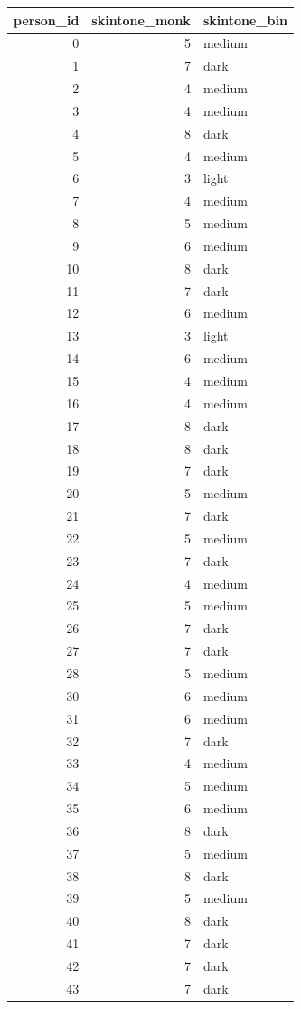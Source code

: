 \begin{tabular}{rrl}
\toprule
person\_id & skintone\_monk & skintone\_bin \\
\midrule
0 & 5 & medium \\
1 & 7 & dark \\
2 & 4 & medium \\
3 & 4 & medium \\
4 & 8 & dark \\
5 & 4 & medium \\
6 & 3 & light \\
7 & 4 & medium \\
8 & 5 & medium \\
9 & 6 & medium \\
10 & 8 & dark \\
11 & 7 & dark \\
12 & 6 & medium \\
13 & 3 & light \\
14 & 6 & medium \\
15 & 4 & medium \\
16 & 4 & medium \\
17 & 8 & dark \\
18 & 8 & dark \\
19 & 7 & dark \\
20 & 5 & medium \\
21 & 7 & dark \\
22 & 5 & medium \\
23 & 7 & dark \\
24 & 4 & medium \\
25 & 5 & medium \\
26 & 7 & dark \\
27 & 7 & dark \\
28 & 5 & medium \\
30 & 6 & medium \\
31 & 6 & medium \\
32 & 7 & dark \\
33 & 4 & medium \\
34 & 5 & medium \\
35 & 6 & medium \\
36 & 8 & dark \\
37 & 5 & medium \\
38 & 8 & dark \\
39 & 5 & medium \\
40 & 8 & dark \\
41 & 7 & dark \\
42 & 7 & dark \\
43 & 7 & dark \\

\end{tabular}
